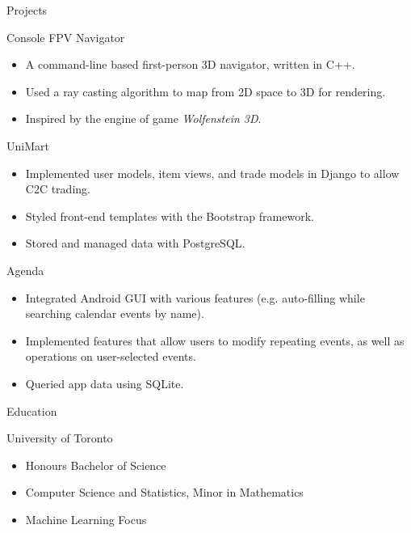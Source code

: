 \documentclass{article}
\newlength{\tabin}
\newlength{\secsep}
\newcommand{\lineunder}{\vspace*{-8pt} \\ \hspace*{-6pt} \hrulefill \\ \vspace*{-15pt}}
\newenvironment{tabbedsection}[1]{
  \begin{list}{}{
      \setlength{\itemsep}{0pt}
      \setlength{\labelsep}{0pt}
      \setlength{\labelwidth}{0pt}
      \setlength{\leftmargin}{\tabin}
      \setlength{\rightmargin}{\tabin}
      \setlength{\listparindent}{0pt}
      \setlength{\parsep}{0pt}
      \setlength{\parskip}{0pt}
      \setlength{\partopsep}{0pt}
      \setlength{\topsep}{#1}
    }
  \item[]
}{\end{list}}
\newenvironment{resume_section}[1]{
  \filbreak
  \vspace{2\secsep}
  \textsc{\large#1}
  \lineunder
  \begin{tabbedsection}{\secsep}
}{\end{tabbedsection}}
\newenvironment{resume_subsection}[2][]{
  \textbf{#2} \hfill {\footnotesize #1} \hspace{2em}
  \begin{tabbedsection}{0.5\secsep}
}{\end{tabbedsection}}
\newenvironment{subitems}{
  \renewcommand{\labelitemi}{-}
  \begin{itemize}
      \setlength{\labelsep}{1em}
}{\end{itemize}}
\begin{document}
\begin{resume_section}{Projects}

 \begin{resume_subsection}[(June 2020)]{Console FPV Navigator}
    \begin{subitems}
    \item A command-line based first-person 3D navigator, written in C++.
    \item Used a ray casting algorithm to map from 2D space to 3D for rendering.
    \item Inspired by the engine of game \textit{Wolfenstein 3D}.
    \end{subitems}
  \end{resume_subsection}

   \begin{resume_subsection}{UniMart}
    \begin{subitems}
    \item Implemented user models, item views, and trade models in Django to allow C2C trading.
    \item Styled front-end templates with the Bootstrap framework.
    \item Stored and managed data with PostgreSQL.
    \end{subitems}
  \end{resume_subsection}

  \begin{resume_subsection}[(April 2020)]{Agenda}
    \begin{subitems}
      \item Integrated Android GUI with various features (e.g.
      auto-filling while searching calendar events by name).
      \item Implemented features that allow users to modify
      repeating events, as well as operations on user-selected events.
      \item Queried app data using SQLite.
    \end{subitems}
  \end{resume_subsection}


\end{resume_section}
  
  \begin{resume_section}{Education}
    \begin{resume_subsection}{University of Toronto}
      \begin{subitems}
        \item Honours Bachelor of Science
        \item Computer Science and Statistics, Minor in Mathematics
        \item Machine Learning Focus
      \end{subitems}
    \end{resume_subsection}
  \end{resume_section}
\end{document}
